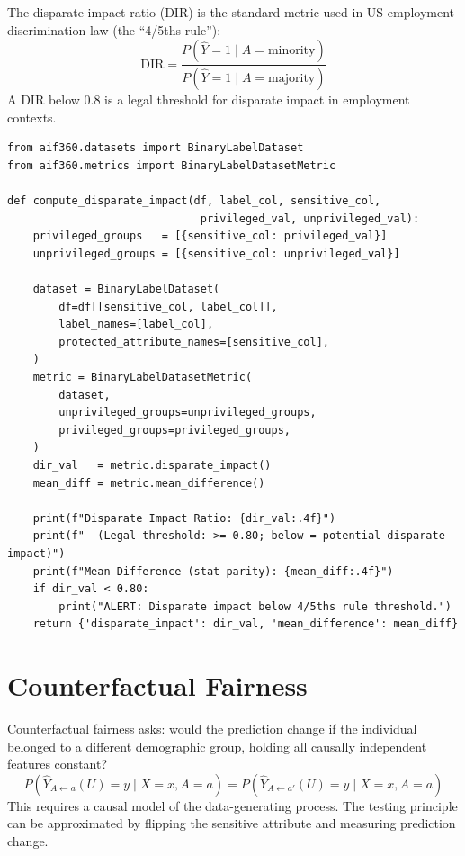 The disparate impact ratio (DIR) is the standard metric used in US employment discrimination law (the ``4/5ths rule''):
\[
\text{DIR} = \frac{P(\hat{Y}=1 \mid A=\text{minority})}{P(\hat{Y}=1 \mid A=\text{majority})}
\]
A DIR below 0.8 is a legal threshold for disparate impact in employment contexts.

\begin{lstlisting}[style=python, caption={Disparate impact ratio via AIF360}]
from aif360.datasets import BinaryLabelDataset
from aif360.metrics import BinaryLabelDatasetMetric

def compute_disparate_impact(df, label_col, sensitive_col,
                              privileged_val, unprivileged_val):
    privileged_groups   = [{sensitive_col: privileged_val}]
    unprivileged_groups = [{sensitive_col: unprivileged_val}]

    dataset = BinaryLabelDataset(
        df=df[[sensitive_col, label_col]],
        label_names=[label_col],
        protected_attribute_names=[sensitive_col],
    )
    metric = BinaryLabelDatasetMetric(
        dataset,
        unprivileged_groups=unprivileged_groups,
        privileged_groups=privileged_groups,
    )
    dir_val   = metric.disparate_impact()
    mean_diff = metric.mean_difference()

    print(f"Disparate Impact Ratio: {dir_val:.4f}")
    print(f"  (Legal threshold: >= 0.80; below = potential disparate impact)")
    print(f"Mean Difference (stat parity): {mean_diff:.4f}")
    if dir_val < 0.80:
        print("ALERT: Disparate impact below 4/5ths rule threshold.")
    return {'disparate_impact': dir_val, 'mean_difference': mean_diff}
\end{lstlisting}

\section{Counterfactual Fairness}
\label{sec:a14-counterfactual}

Counterfactual fairness \autocite{kusner2017counterfactual} asks: would the prediction change if the individual belonged to a different demographic group, holding all causally independent features constant?
\[
P(\hat{Y}_{A \leftarrow a}(U) = y \mid X=x, A=a) = P(\hat{Y}_{A \leftarrow a'}(U) = y \mid X=x, A=a)
\]
This requires a causal model of the data-generating process. The testing principle can be approximated by flipping the sensitive attribute and measuring prediction change.

